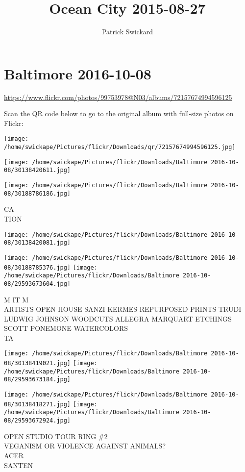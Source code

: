 \documentclass[10pt,letterpaper]{article}
\title{Ocean City 2015-08-27}
\author{Patrick Swickard}
\date{}
\begin{document}
\section*{Baltimore 2016-10-08}

\url{https://www.flickr.com/photos/99753978@N03/albums/72157674994596125}

Scan the QR code below to go to the original album with full-size photos on Flickr:

\texttt{[image: /home/swickape/Pictures/flickr/Downloads/qr/72157674994596125.jpg]}
\pagebreak

\texttt{[image: /home/swickape/Pictures/flickr/Downloads/Baltimore 2016-10-08/30138420611.jpg]}

\vspace{0.25in}
\texttt{[image: /home/swickape/Pictures/flickr/Downloads/Baltimore 2016-10-08/30188786186.jpg]}

CA\\
TION
\pagebreak

\texttt{[image: /home/swickape/Pictures/flickr/Downloads/Baltimore 2016-10-08/30138420081.jpg]}

\vspace{0.25in}
\texttt{[image: /home/swickape/Pictures/flickr/Downloads/Baltimore 2016-10-08/30188785376.jpg]}
\texttt{[image: /home/swickape/Pictures/flickr/Downloads/Baltimore 2016-10-08/29593673604.jpg]}

M IT M\\
ARTISTS OPEN HOUSE SANZI KERMES REPURPOSED PRINTS TRUDI LUDWIG JOHNSON WOODCUTS ALLEGRA MARQUART ETCHINGS SCOTT PONEMONE WATERCOLORS\\
TA
\pagebreak

\texttt{[image: /home/swickape/Pictures/flickr/Downloads/Baltimore 2016-10-08/30138419021.jpg]}
\texttt{[image: /home/swickape/Pictures/flickr/Downloads/Baltimore 2016-10-08/29593673184.jpg]}

\texttt{[image: /home/swickape/Pictures/flickr/Downloads/Baltimore 2016-10-08/30138418271.jpg]}
\texttt{[image: /home/swickape/Pictures/flickr/Downloads/Baltimore 2016-10-08/29593672924.jpg]}

OPEN STUDIO TOUR RING \#2\\
VEGANISM OR VIOLENCE AGAINST ANIMALS?\\
ACER\\
SANTEN
\pagebreak
\end{document}
